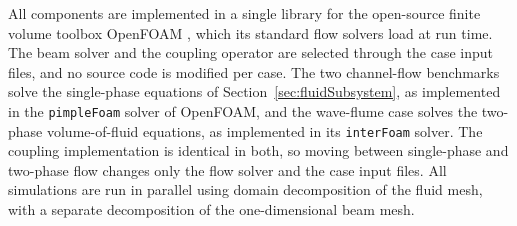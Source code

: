 \noindent
All components are implemented in a single library for the open-source finite volume toolbox OpenFOAM \citep{weller_tensorial_1998}, which its standard flow solvers load at run time. The beam solver and the coupling operator are selected through the case input files, and no source code is modified per case. The two channel-flow benchmarks solve the single-phase equations of Section~\ref{sec:fluidSubsystem}, as implemented in the \texttt{pimpleFoam} solver of OpenFOAM, and the wave-flume case solves the two-phase volume-of-fluid equations, as implemented in its \texttt{interFoam} solver. The coupling implementation is identical in both, so moving between single-phase and two-phase flow changes only the flow solver and the case input files. All simulations are run in parallel using domain decomposition of the fluid mesh, with a separate decomposition of the one-dimensional beam mesh.
